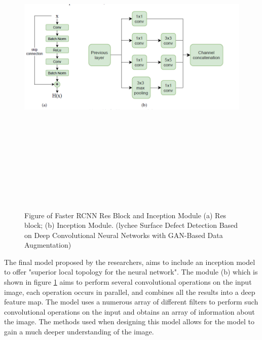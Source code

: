  \begin{figure}[H]
    \centering
    \includegraphics[width=1\textwidth,height=15cm,keepaspectratio]{Images/FasterRCNNResBlockInceptionModule.PNG}\\
    \caption{Figure of Faster RCNN Res Block and Inception Module (a) Res block; (b) Inception Module. (lychee Surface Defect Detection Based on Deep Convolutional Neural Networks with GAN-Based Data Augmentation)\cite{litReviewLychee}}
    \label{fig:Figure of Faster RCNN Res Block and Inception Module (lychee Surface Defect Detection Based on Deep Convolutional Neural Networks with GAN-Based Data Augmentation)}
\end{figure}
\vspace{0.5mm}
The final model proposed by the researchers, aims to include an inception model to offer "superior local topology for the neural network"\cite{litReviewLychee}.  The module (b) which is shown in figure \ref{fig:Figure of Faster RCNN Res Block and Inception Module (lychee Surface Defect Detection Based on Deep Convolutional Neural Networks with GAN-Based Data Augmentation)} aims to perform several convolutional operations on the input image, each operation occurs in parallel, and combines all the results into a deep feature map.  The model uses a numerous array of different filters to perform such convolutional operations on the input and obtains an array of information about the image.  The methods used when designing this model allows for the model to gain a much deeper understanding of the image.
